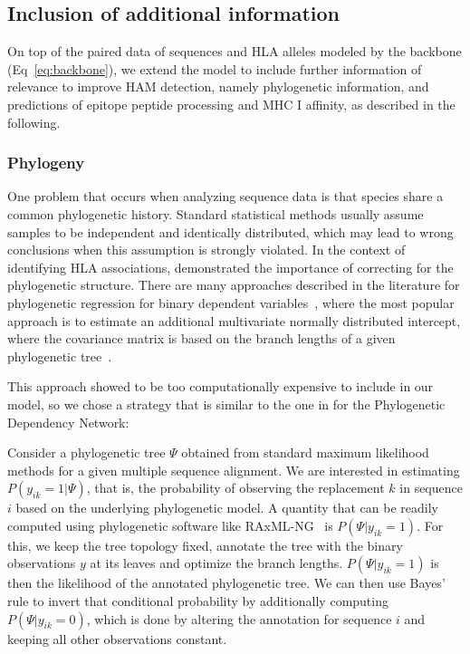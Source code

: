 \documentclass{bioinfo}
\begin{document}
\begin{methods}

\subsection{Inclusion of additional information}

On top of the paired data of sequences and HLA alleles modeled by the backbone (Eq~\ref{eq:backbone}), we extend the model to include further information of relevance to improve HAM detection, namely phylogenetic information, and predictions of epitope peptide processing and MHC I affinity, as described in the following.

\subsubsection{Phylogeny}
One problem that occurs when analyzing sequence data is that species share a common phylogenetic history. Standard statistical methods usually assume samples to be independent and identically distributed, which may lead to wrong conclusions when this assumption is strongly violated.
In the context of identifying HLA associations, \citet{Bhattacharya2007} demonstrated the importance of correcting for the phylogenetic structure.
There are many approaches described in the literature for phylogenetic regression for binary dependent variables~\citep{Ives2014}, where the most popular approach is to estimate an additional multivariate normally distributed intercept, where the covariance matrix is based on the branch lengths of a given phylogenetic tree~\citep{Ives2009}.

This approach showed to be too computationally expensive to include in our model, so we chose a strategy that is similar to the one in \citet{Carlson2008} for the Phylogenetic Dependency Network:

Consider a phylogenetic tree \(\Psi\) obtained from standard maximum likelihood methods for a given multiple sequence alignment. We are interested in estimating \(P(y_{ik}=1|\Psi)\), that is, the probability of observing the replacement \(k\) in sequence \(i\) based on the underlying phylogenetic model.
A quantity that can be readily computed using phylogenetic software like RAxML-NG~\cite{Kozlov2019} is \(P(\Psi|y_{ik}=1)\). For this, we keep the tree topology fixed, annotate the tree with the binary observations \(y\) at its leaves and optimize the branch lengths. \(P(\Psi|y_{ik}=1)\) is then the likelihood of the annotated phylogenetic tree. We can then use Bayes' rule to invert that conditional probability by additionally computing \(P(\Psi|y_{ik}=0)\), which is done by altering the annotation for sequence \(i\) and keeping all other observations constant.


\end{methods}
\end{document}
